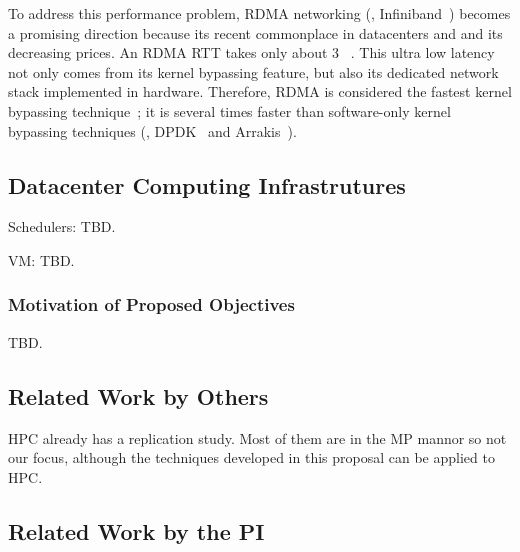 To address this \paxos performance problem, RDMA networking (\eg, 
Infiniband~\cite{infiniband}) becomes a promising direction because its recent 
commonplace in datacenters and and its decreasing prices. An RDMA RTT takes 
only about 3 \us~\cite{pilaf:usenix14}. This ultra low latency not only comes 
from its kernel bypassing feature, but also its dedicated network stack 
implemented in hardware. Therefore, RDMA is considered the fastest kernel 
bypassing technique~\cite{herd:sigcomm14,pilaf:usenix14,dare:hpdc15}; it is 
several times faster than software-only kernel bypassing techniques (\eg, 
DPDK~\cite{dpdk} and Arrakis~\cite{arrakis:osdi14}).

\vspace{-.15in}\subsection{Datacenter Computing Infrastrutures}
\label{sec:datacenter}\vspace{-.075in}

Schedulers: TBD.

VM: TBD.


\vspace{-.15in}\subsubsection{Motivation of Proposed Objectives} 
\label{sec:motivation}\vspace{-.075in}

TBD.

\vspace{-.15in}\subsection{Related Work by Others} 
\label{sec:others-work}\vspace{-.075in}




 HPC already has a replication study. Most of them are in the MP 
mannor so not our focus, although the techniques developed in this proposal can 
be applied to HPC.

\vspace{-.15in}\subsection{Related Work by the PI} 
\label{sec:my-work}\vspace{-.075in}
% 

